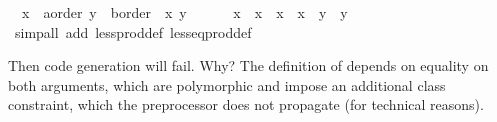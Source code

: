 \begin{isabellebody}
\ \ {\isachardoublequoteopen}{\isacharparenleft}x{}\ {\isasymColon}\ {\isacharprime}a{\isasymColon}order{\isacharcomma}\ y{}\ {\isasymColon}\ {\isacharprime}b{\isasymColon}order{\isacharparenright}\ {\isasymle}\ {\isacharparenleft}x{}{\isacharcomma}\ y{}{\isacharparenright}\ {\isasymlongleftrightarrow}\isanewline
\ \ \ \ \ x{}\ {\isacharless}\ x{}\ {\isasymor}\ x{}\ {\isacharequal}\ x{}\ {\isasymand}\ y{}\ {\isasymle}\ y{}{\isachardoublequoteclose}\isanewline
\ \ \isamarkupfalse%
\ {\isacharparenleft}simp{\isacharunderscore}all\ add{\isacharcolon}\ less{\isacharunderscore}prod{\isacharunderscore}def\ less{\isacharunderscore}eq{\isacharunderscore}prod{\isacharunderscore}def{\isacharparenright}%
\endisatagquoteme
{\isafoldquoteme}%
%
\isadelimquoteme
%
\endisadelimquoteme
%
\begin{isamarkuptext}%
\noindent Then code generation will fail.  Why?  The definition
  of  depends on equality on both arguments,
  which are polymorphic and impose an additional 
  class constraint, which the preprocessor does not propagate
  (for technical reasons).


\end{isamarkuptext}
\end{isabellebody}
